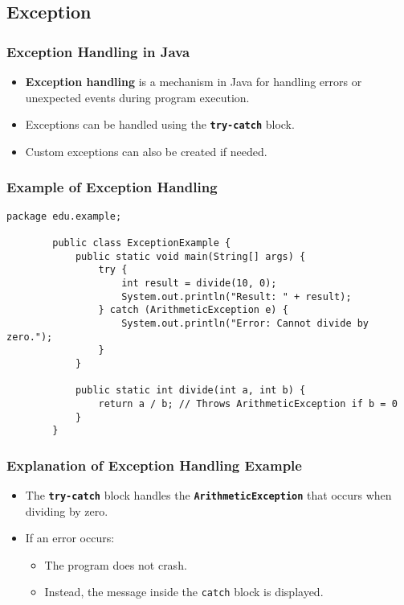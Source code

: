 \documentclass[aspectratio=169, table]{beamer}
\begin{document}
\subsection{Exception}
\begin{frame}[fragile]
	\frametitle{Exception Handling in Java}
	
	\begin{itemize}
		\item \textbf{Exception handling} is a mechanism in Java for handling errors or unexpected events during program execution.
		\item Exceptions can be handled using the \textbf{\texttt{try-catch}} block.
		\item Custom exceptions can also be created if needed.
	\end{itemize}
\end{frame}

\begin{frame}[fragile]
	\frametitle{Example of Exception Handling}
	
	\begin{lstlisting}[style=JavaStyle, caption={Exception Handling Example: \texttt{ExceptionExample.java}}]
		package edu.example;
		
		public class ExceptionExample {
			public static void main(String[] args) {
				try {
					int result = divide(10, 0);
					System.out.println("Result: " + result);
				} catch (ArithmeticException e) {
					System.out.println("Error: Cannot divide by zero.");
				}
			}
			
			public static int divide(int a, int b) {
				return a / b; // Throws ArithmeticException if b = 0
			}
		}
	\end{lstlisting}
\end{frame}

\begin{frame}[fragile]
	\frametitle{Explanation of Exception Handling Example}
	
	\begin{itemize}
		\item The \textbf{\texttt{try-catch}} block handles the \textbf{\texttt{ArithmeticException}} that occurs when dividing by zero.
		\item If an error occurs:
		\begin{itemize}
			\item The program does not crash.
			\item Instead, the message inside the \texttt{catch} block is displayed.
		\end{itemize}
	\end{itemize}
\end{frame}
\end{document}
